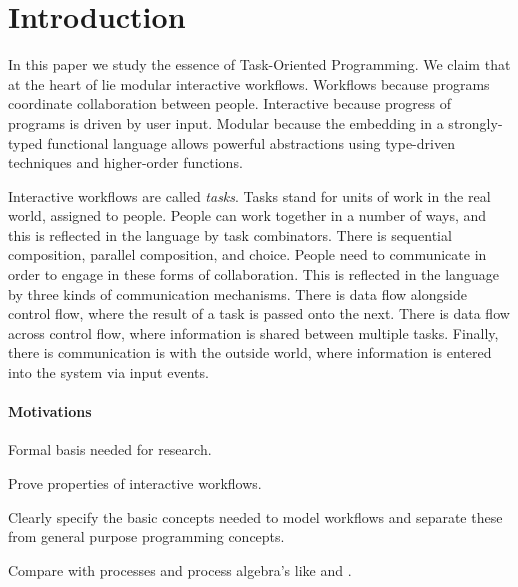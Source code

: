


\section{Introduction}

In this paper we study the essence of Task-Oriented Programming.
We claim that at the heart of \TOP lie modular interactive workflows.
Workflows because \TOP programs coordinate collaboration between people.
Interactive because progress of \TOP programs is driven by user input.
Modular because the embedding in a strongly-typed functional language allows powerful abstractions using type-driven techniques and higher-order functions.

Interactive workflows are called \emph{tasks}.
Tasks stand for units of work in the real world, assigned to people.
People can work together in a number of ways, and this is reflected in the language by task combinators.
There is sequential composition, parallel composition, and choice.
People need to communicate in order to engage in these forms of collaboration.
This is reflected in the language by three kinds of communication mechanisms.
There is data flow alongside control flow, where the result of a task is passed onto the next.
There is data flow across control flow, where information is shared between multiple tasks.
Finally, there is communication is with the outside world, where information is entered into the system via input events.


\paragraph{Motivations}
\begin{itemize*}
  \item Formal basis needed for research.
  \item Prove properties of interactive workflows.
  \item Clearly specify the basic concepts needed to model workflows
    and separate these from general purpose programming concepts.
  \item Compare \TOP with processes and process algebra's like \CSP and \CCS.
\end{itemize*}


